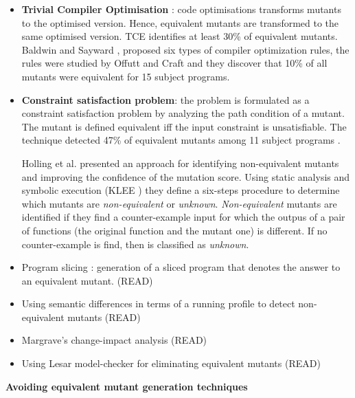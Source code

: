 \begin{itemize}
	\item \textbf{Trivial Compiler Optimisation} \cite{papadakis2015trivial, kintis2017detecting,papadakis2019mutation}: code optimisations transforms mutants to the optimised version. Hence, equivalent mutants are transformed to the same optimised version. TCE identifies at least 30\% of equivalent mutants.
	Baldwin and Sayward \cite{baldwin1979heuristics}, proposed six types of compiler optimization rules, the rules were studied by Offutt and Craft \cite{offutt1994using} and they discover that 10\% of all mutants were equivalent for 15 subject programs.
	
	\item \textbf{Constraint satisfaction problem}: the problem is formulated as a constraint satisfaction problem by analyzing the path condition of a mutant. The mutant is defined equivalent iff the input constraint is unsatisfiable. The technique detected 47\% of equivalent mutants among 11 subject programs \cite{offutt1996detecting,offutt1997automatically}.

	Holling et al. \cite{holling2016nequivack} presented an approach for identifying non-equivalent mutants and improving the confidence of the mutation score. Using static analysis and symbolic execution (KLEE \cite{cadar2008klee}) they define a six-steps procedure to determine which mutants are \textit{non-equivalent} or \textit{unknown}. \textit{Non-equivalent} mutants are identified if they find a counter-example input for which the outpus of a pair of functions (the original function and the mutant one) is different. If no counter-example is find, then is classified as \textit{unknown}.

	\item Program slicing \cite{voas1997software, hierons1999using, harman2001relationship}: generation of a sliced program that denotes the answer to an equivalent mutant. (READ)
	\item Using semantic differences in terms of a running profile to detect non-equivalent mutants \cite{ellims2007csaw} (READ)
	\item Margrave's change-impact analysis \cite{martin2007fault} (READ)
	\item Using Lesar model-checker for eliminating equivalent mutants \cite{du2008towards} (READ)
\end{itemize}

\textbf{Avoiding equivalent mutant generation techniques}

